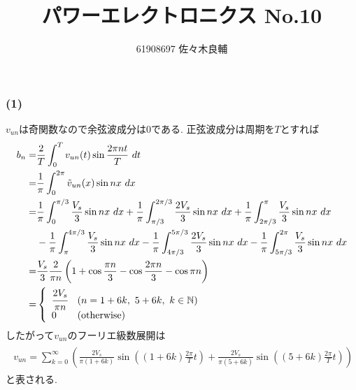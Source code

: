 \documentclass[uplatex,a4j,11pt,dvipdfmx]{jsarticle}
\begin{document}
\title{パワーエレクトロニクス No.10}
\author{61908697 佐々木良輔}
\date{}
\maketitle
\subsubsection*{(1)}
$v_{un}$は奇関数なので余弦波成分は$0$である.
正弦波成分は周期を$T$とすれば
\begin{align}
  \begin{split}
    b_n=&\frac{2}{T}\int_0^Tv_{un}(t)\sin\frac{2\pi nt}{T}\ dt\\
    =&\frac{1}{\pi}\int_0^{2\pi}\tilde{v}_{un}(x)\sin nx\ dx\\
    =&\frac{1}{\pi}\int_0^{\pi/3}\frac{V_s}{3}\sin nx\ dx+\frac{1}{\pi}\int_{\pi/3}^{2\pi/3}\frac{2V_s}{3}\sin nx\ dx
    +\frac{1}{\pi}\int_{2\pi/3}^{\pi}\frac{V_s}{3}\sin nx\ dx\\
    &-\frac{1}{\pi}\int_\pi^{4\pi/3}\frac{V_s}{3}\sin nx\ dx-\frac{1}{\pi}\int_{4\pi/3}^{5\pi/3}\frac{2V_s}{3}\sin nx\ dx
    -\frac{1}{\pi}\int_{5\pi/3}^{2\pi}\frac{V_s}{3}\sin nx\ dx\\
    =&\frac{V_s}{3}\frac{2}{\pi n}\left(1+\cos\frac{\pi n}{3}-\cos\frac{2\pi n}{3}-\cos\pi n\right)\\
    =&\left\{
    \begin{array}{ll}
      \cfrac{2V_s}{\pi n}&(n=1+6k,\ 5+6k,\ k\in\mathbb{N})\\
      0&({\rm otherwise})
    \end{array}
    \right.
  \end{split}
\end{align}
したがって$v_{un}$のフーリエ級数展開は
\begin{align}
  \begin{split}
    v_{un}=\sum_{k=0}^\infty\left(\frac{2V_s}{\pi(1+6k)}\sin\left((1+6k)\frac{2\pi}{T}t\right)+\frac{2V_s}{\pi(5+6k)}\sin\left((5+6k)\frac{2\pi}{T}t\right)\right)
  \end{split}
\end{align}
と表される.
\end{document}
